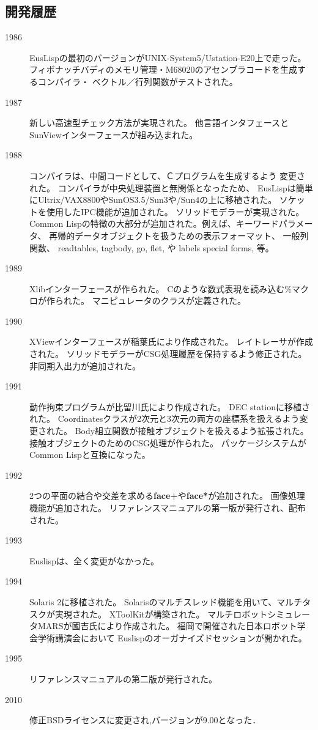 \subsection{開発履歴}
\begin{description}
\item[1986] EusLispの最初のバージョンがUNIX-System5/Ustation-E20上で走った。
フィボナッチバディのメモリ管理・M68020のアセンブラコードを生成するコンパイラ・
ベクトル／行列関数がテストされた。
\item[1987] 新しい高速型チェック方法が実現された。
他言語インタフェースとSunViewインターフェースが組み込まれた。
\item[1988] コンパイラは、中間コードとして、Ｃプログラムを生成するよう
変更された。
コンパイラが中央処理装置と無関係となったため、
EusLispは簡単にUltrix/VAX8800やSunOS3.5/Sun3や/Sun4の上に移植された。
ソケットを使用したIPC機能が追加された。
ソリッドモデラーが実現された。
Common Lispの特徴の大部分が追加された。例えば、キーワードパラメータ、
再帰的データオブジェクトを扱うための表示フォーマット、
一般列関数、
readtables, tagbody, go, flet, や labels special forms, 等。
\item[1989] Xlibインターフェースが作られた。
Cのような数式表現を読み込む\%マクロが作られた。
マニピュレータのクラスが定義された。
\item[1990] XViewインターフェースが稲葉氏により作成された。
レイトレーサが作成された。
ソリッドモデラーがCSG処理履歴を保持するよう修正された。
非同期入出力が追加された。
\item[1991] 動作拘束プログラムが比留川氏により作成された。
DEC stationに移植された。
Coordinatesクラスが2次元と3次元の両方の座標系を扱えるよう変更された。
Body組立関数が接触オブジェクトを扱えるよう拡張された。
接触オブジェクトのためのCSG処理が作られた。
パッケージシステムがCommon Lispと互換になった。
\item[1992]
2つの平面の結合や交差を求める{\bf face+}や{\bf face*}が追加された。
画像処理機能が追加された。
リファレンスマニュアルの第一版が発行され、配布された。
\item[1993]
Euslispは、全く変更がなかった。
\item[1994] Solaris 2に移植された。
Solarisのマルチスレッド機能を用いて、マルチタスクが実現された。
XToolKitが構築された。
マルチロボットシミュレータMARSが國吉氏により作成された。
福岡で開催された日本ロボット学会学術講演会において
Euslispのオーガナイズドセッションが開かれた。
\item[1995]
リファレンスマニュアルの第二版が発行された。
\item[2010] 修正BSDライセンスに変更され,バージョンが9.00となった．

\end{description}
